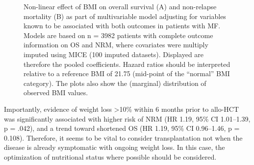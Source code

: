 \documentclass[
  letterpaper,
  paper=240mm:170mm,
  twoside=true,
  open=right,
  fontsize=10pt,
  pagesize=false,
  BCOR=15mm,
  DIV=14,
  headinclude=true,
  footinclude=false,
  headsepline=on]{scrbook}
\begin{document}
\begin{figure}


\caption{\label{fig-polv-one}Non-linear effect of BMI on overall
survival (A) and non-relapse mortality (B) as part of multivariable
model adjusting for variables known to be associated with both outcomes
in patients with MF. Models are based on n = 3982 patients with complete
outcome information on OS and NRM, where covariates were multiply
imputed using MICE (100 imputed datasets). Displayed are therefore the
pooled coefficients. Hazard ratios should be interpreted relative to a
reference BMI of 21.75 (mid-point of the ``normal'' BMI category). The
plots also show the (marginal) distribution of observed BMI values.}

\end{figure}%

Importantly, evidence of weight loss \textgreater10\% within 6 months
prior to allo-HCT was significantly associated with higher risk of NRM
(HR 1.19, 95\% CI 1.01--1.39, p = .042), and a trend toward shortened OS
(HR 1.19, 95\% CI 0.96--1.46, p = 0.108). Therefore, it seems to be
vital to consider transplantation not when the disease is already
symptomatic with ongoing weight loss. In this case, the optimization of
nutritional status where possible should be considered.
\end{document}
